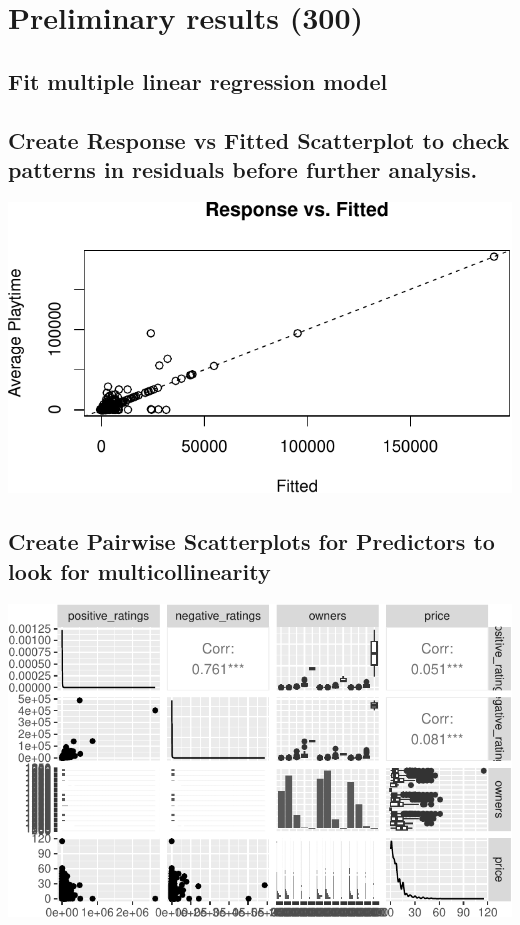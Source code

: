\documentclass[
  letterpaper,
  DIV=11,
  numbers=noendperiod]{scrartcl}
\begin{document}
\hypertarget{preliminary-results-300}{%
\section{Preliminary results (300)}\label{preliminary-results-300}}

\hypertarget{fit-multiple-linear-regression-model}{%
\subsection{Fit multiple linear regression
model}\label{fit-multiple-linear-regression-model}}

\hypertarget{create-response-vs-fitted-scatterplot-to-check-patterns-in-residuals-before-further-analysis.}{%
\subsection{Create Response vs Fitted Scatterplot to check patterns in
residuals before further
analysis.}\label{create-response-vs-fitted-scatterplot-to-check-patterns-in-residuals-before-further-analysis.}}

\includegraphics{proposal_files/figure-pdf/unnamed-chunk-6-1.pdf}

\hypertarget{create-pairwise-scatterplots-for-predictors-to-look-for-multicollinearity}{%
\subsection{Create Pairwise Scatterplots for Predictors to look for
multicollinearity}\label{create-pairwise-scatterplots-for-predictors-to-look-for-multicollinearity}}

\includegraphics{proposal_files/figure-pdf/unnamed-chunk-7-1.pdf}
\end{document}
